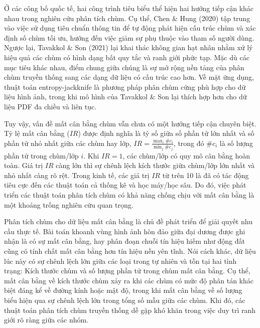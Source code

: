 \documentclass[a4paper,oneside]{book} %
\theoremstyle{plain}
\theoremstyle{plain}
\theoremstyle{nonumberplain}
\begin{document}
Ở các công bố quốc tế, hai công trình tiêu biểu thể hiện hai hướng tiếp cận khác nhau trong nghiên cứu phân tích chùm. Cụ thể, Chen \& Hung (2020) \cite{chen2021jackknife} tập trung vào việc sử dụng tiêu chuẩn thông tin để tự động phát hiện cấu trúc chùm và xác định số chùm tối ưu, hướng đến việc giảm sự phụ thuộc vào tham số người dùng. Ngược lại, Tavakkol \& Son (2021) \cite{tavakkol2021fuzzy} lại khai thác không gian hạt nhân nhằm xử lý hiệu quả các chùm có hình dạng bất quy tắc và ranh giới phức tạp.
Mặc dù các mục tiêu khác nhau, điểm chung giữa chúng là sự mở rộng nền tảng của phân chùm truyền thống sang các dạng dữ liệu có cấu trúc cao hơn. Về mặt ứng dụng, thuật toán entropy-jackknife là phương pháp phân chùm cứng phù hợp cho dữ liệu hình ảnh, trong khi mô hình của Tavakkol \& Son lại thích hợp hơn cho dữ liệu PDF đa chiều và liên tục.



Tuy vậy, vấn đề mất cân bằng chùm vẫn chưa có một hướng tiếp cận chuyên biệt. Tỷ lệ mất cân bằng ($IR$)  được định nghĩa là tỷ số giữa số phần tử lớn nhất và số phần tử nhỏ nhất giữa các chùm hay lớp, $
IR = \frac{\max_i\#c_i}{\min_j \#c_j}$, trong đó $\#c_i$ là số lượng phần tử trong chùm/lớp $i$. Khi $IR=1$, các chùm/lớp có quy mô cân bằng hoàn toàn. Giá trị $IR$ càng lớn thì sự chênh lệch kích thước giữa chùm/lớp lớn nhất và nhỏ nhất càng rõ rệt. Trong kinh tế, các giá trị $IR$ từ trên 10 là đã có tác động tiêu cực đến các thuật toán cả thống kê và học máy/học sâu. Do đó, việc phát triển các thuật toán phân tích chùm có khả năng chống chịu với mất cân bằng là một khoảng trống nghiên cứu quan trọng.


Phân tích chùm cho dữ liệu mất cân bằng là chủ đề phát triển để giải quyết nhu cầu thực tế. Bài toán khoanh vùng hình ảnh hòn đảo giữa đại dương được ghi nhận là có sự mất cân bằng, hay phân đoạn chuỗi tín hiệu hiếm như động đất cũng có tính chất mất cân bằng hơn tín hiệu nền yên tĩnh. Nói cách khác, dữ liệu lúc này có sự chênh lệch lớn giữa các loại trong tự nhiên và tồn tại hai tình trạng: Kích thước chùm và số lượng phần tử trong chùm mất cân bằng. 
Cụ thể, mất cân bằng về kích thước chùm xảy ra khi các chùm có mức độ phân tán khác biệt đáng kể về đường kính hoặc mật độ, trong khi mất cân bằng về số lượng biểu hiện qua sự chênh lệch lớn trong tổng số mẫu giữa các chùm. Khi đó, các thuật toán phân tích chùm truyền thống dễ gặp khó khăn trong việc duy trì ranh giới rõ ràng giữa các nhóm.
\end{document}

